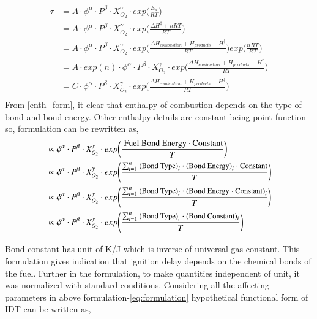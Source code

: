 \documentclass[preprint,12pt]{elsarticle}
\begin{document}
		\begin{equation}
		\begin{aligned}
		\tau &= A \cdot \phi^\alpha  \cdot P^\beta  \cdot X_{O_2}^\gamma  \cdot exp\bigg(\frac{E_a}{RT}\bigg) \\
		&= A \cdot \phi^\alpha \cdot P^\beta  \cdot X_{O_2}^\gamma  \cdot exp\bigg(\frac{\Delta H^{\ddagger} + nRT}{RT}\bigg) \\
		&= A \cdot \phi^\alpha  \cdot P^\beta  \cdot X_{O_2}^\gamma  \cdot exp\bigg(\frac{\Delta H_{combustion} + H_{products} - H^{\ddagger}}{RT}\bigg)exp\bigg(\frac{nRT}{RT}\bigg) \\
		&= A \cdot exp(n) \cdot \phi^\alpha  \cdot P^\beta  \cdot X_{O_2}^\gamma   \cdot exp\bigg(\frac{\Delta H_{combustion} + H_{products} - H^{\ddagger}}{RT}\bigg) \\
		&= C \cdot \phi^\alpha  \cdot P^\beta  \cdot X_{O_2}^\gamma  \cdot exp\bigg(\frac{\Delta H_{combustion} + H_{products} - H^{\ddagger}}{RT}\bigg) \\
		\end{aligned}
		\end{equation}
		From-\ref{enth_form}, it clear that enthalpy of combustion depends on the type of bond and bond energy. Other enthalpy details are constant being point function so, formulation can be rewritten as,
		\begin{equation}\label{eq:formulation}
		\begin{aligned}		
			&\propto  \phi^\alpha \cdot P^\beta  \cdot X_{O_2}^\gamma   \cdot exp\bigg(\frac{\text{ Fuel Bond Energy}\cdot \text{Constant}}{T}\bigg) \\
			&\propto  \phi^\alpha \cdot P^\beta  \cdot X_{O_2}^\gamma   \cdot exp\Bigg(\small{\frac{ \sum_{i=1}^{n} \text{(Bond Type)}_i \cdot \text{(Bond Energy)}_i \cdot \text{Constant} }{T}} \Bigg) \\
			&\propto  \phi^\alpha \cdot P^\beta  \cdot X_{O_2}^\gamma   \cdot exp\Bigg(\small{\frac{ \sum_{i=1}^{n}\text{(Bond Type)}_i \cdot \text{(Bond Energy $\cdot$ Constant)}_i}{T}} \Bigg) \\
			&\propto  \phi^\alpha \cdot P^\beta  \cdot X_{O_2}^\gamma   \cdot exp\Bigg(\small{\frac{ \sum_{i=1}^{n}\text{(Bond Type)}_i \cdot \text{(Bond Constant)}_i}{T}} \Bigg) 
			\end{aligned}
		\end{equation}
		
		Bond constant has unit of K/J which is inverse of universal gas constant. This formulation gives indication that ignition delay depends on the chemical bonds of the fuel. Further in the formulation, to make quantities independent of unit, it was normalized with standard conditions. Considering all the affecting parameters in above formulation-\ref{eq:formulation} hypothetical functional form of IDT can be written as,
	
\end{document}
